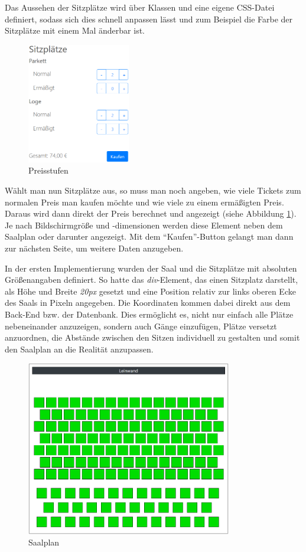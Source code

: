 Das Aussehen der Sitzplätze wird über Klassen und eine eigene \acs{CSS}-Datei definiert, sodass sich dies schnell anpassen lässt und zum Beispiel die Farbe der Sitzplätze mit einem Mal änderbar ist.

\begin{figure}[ht]
	\centering
	\includegraphics[width=0.4\textwidth]{img/screenshots/saalplan02}
	\captionsetup{format=hang}
	\caption{Preisstufen}
	\label{fig:saalplan02}
\end{figure}

Wählt man nun Sitzplätze aus, so muss man noch angeben, wie viele Tickets zum normalen Preis man kaufen möchte und wie viele zu einem ermäßigten Preis.
Daraus wird dann direkt der Preis berechnet und angezeigt (siehe Abbildung \ref{fig:saalplan02}).
Je nach Bildschirmgröße und -dimensionen werden diese Element neben dem Saalplan oder darunter angezeigt.
Mit dem \enquote{Kaufen}-Button gelangt man dann zur nächsten Seite, um weitere Daten anzugeben.

In der ersten Implementierung wurden der Saal und die Sitzplätze mit absoluten Größenangaben definiert.
So hatte das \textit{div}-Element, das einen Sitzplatz darstellt, als Höhe und Breite \textit{20px} gesetzt und eine Position relativ zur links oberen Ecke des Saals in Pixeln angegeben.
Die Koordinaten kommen dabei direkt aus dem Back-End bzw. der Datenbank.
Dies ermöglicht es, nicht nur einfach alle Plätze nebeneinander anzuzeigen, sondern auch Gänge einzufügen, Plätze versetzt anzuordnen, die Abstände zwischen den Sitzen individuell zu gestalten und somit den Saalplan an die Realität anzupassen.

\begin{figure}[ht]
	\centering
	\includegraphics[width=0.8\textwidth]{img/screenshots/saalplan03}
	\captionsetup{format=hang}
	\caption{\label{fig:saalplan03}Saalplan}
\end{figure}
